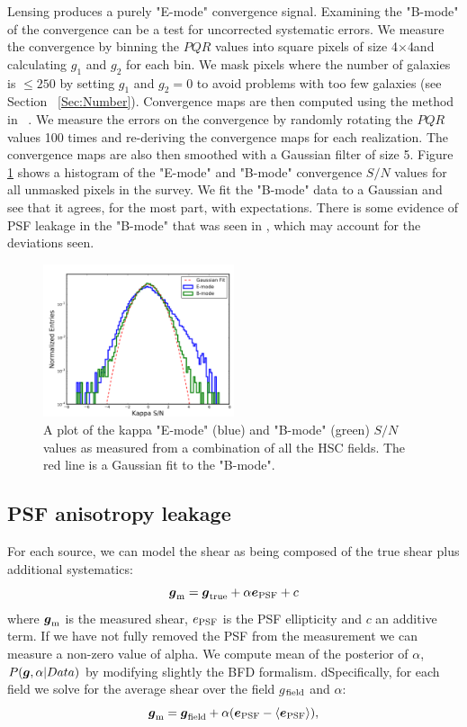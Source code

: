 \documentclass[useAMS,usenatbib]{mnras}
\newcommand{\vecg}{\mbox{\boldmath $g$}}
\newcommand{\vece}{\mbox{\boldmath $e$}}
\begin{document}
Lensing produces a purely "E-mode" convergence signal.  Examining the "B-mode" of the convergence can be a test for uncorrected systematic errors.  We measure the convergence by binning the $PQR$ values into square pixels of size 4\arcmin$\times$4\arcmin and calculating $g_1$ and $g_2$ for each bin.  We mask pixels where the number of galaxies is $\leq 250$ by setting $g_1$ and $g_2=0$ to avoid problems with too few galaxies (see Section ~\ref{Sec:Number}).  Convergence maps are then computed using the method in ~\cite{1993ApJ...404..441K}. We measure the errors on the convergence by randomly rotating the $PQR$ values 100 times and re-deriving the convergence maps for each realization.  The convergence maps are also then smoothed with a Gaussian filter of size 5\arcmin.  Figure \ref{fig:bmode} shows a histogram of the "E-mode" and "B-mode" convergence $S/N$ values for all unmasked pixels in the survey.  We fit the "B-mode" data to a Gaussian and see that it agrees, for the most part, with expectations.  There is some evidence of PSF leakage in the "B-mode" that was seen in \cite{ShearPaper:inprep}, which may account for the deviations seen.

\begin{figure}
    \includegraphics[width=0.5\textwidth]{bmode.png}
    \caption{
    A plot of the kappa "E-mode" (blue) and "B-mode" (green) $S/N$ values as measured from a combination of all the HSC fields.  The red line is a Gaussian fit to the "B-mode".
    }
    \label{fig:bmode}
\end{figure}


\subsection{PSF anisotropy leakage}
For each source, we can model the shear as being composed of the true shear plus additional systematics:
\begin{equation}
\vecg_{\rm m} = \vecg_{\rm true} + \alpha \vece_{\rm PSF} + c
\end{equation}
where $\vecg_{\rm m}$ is the measured shear, $e_{\rm PSF}$ is the PSF ellipticity and $c$ an additive term.  If we have not fully removed the PSF from the measurement we can measure a non-zero value of alpha.  We compute mean of the posterior of $\alpha$, $P(\vecg,\alpha|Data)$ by modifying slightly the BFD formalism.
dSpecifically, for each field we solve for the average shear over the field \vecg$_{\rm field}$ and $\alpha$:
\begin{equation}
\vecg_{\rm m} = \vecg_{\rm field} + \alpha(\vece_{\rm PSF}-\langle\vece_{\rm PSF}\rangle),
\end{equation}
\end{document}
